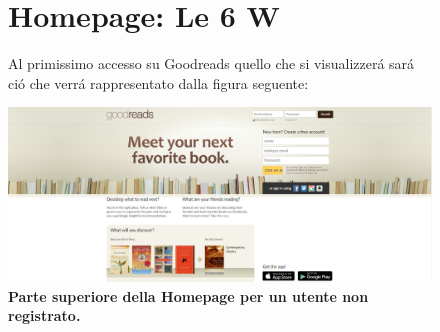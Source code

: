 \documentclass[12pt]{article}
\begin{document}
\begin{figure}
\section{Homepage: Le 6 W}
\begin{flushleft}
Al primissimo accesso su Goodreads quello che si visualizzer\'a sar\'a ci\'o che verr\'a rappresentato dalla figura seguente: 
\end{flushleft}
	\centering 
	\includegraphics[width=16.5cm]{resources/homenotlogged_1.png}
	\caption{\textbf{Parte superiore della Homepage per un utente non registrato.}}
\end{figure}
\end{document}
